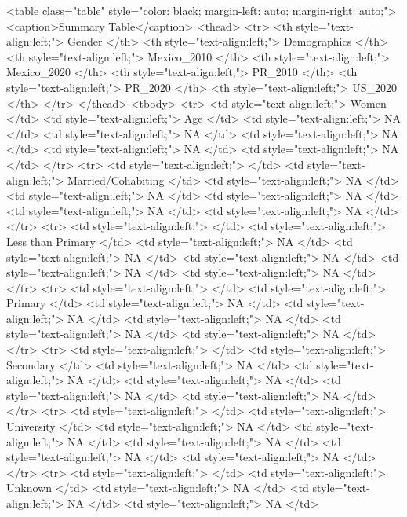 <table class="table" style="color: black; margin-left: auto; margin-right: auto;">
<caption>Summary Table</caption>
 <thead>
  <tr>
   <th style="text-align:left;"> Gender </th>
   <th style="text-align:left;"> Demographics </th>
   <th style="text-align:left;"> Mexico_2010 </th>
   <th style="text-align:left;"> Mexico_2020 </th>
   <th style="text-align:left;"> PR_2010 </th>
   <th style="text-align:left;"> PR_2020 </th>
   <th style="text-align:left;"> US_2020 </th>
  </tr>
 </thead>
<tbody>
  <tr>
   <td style="text-align:left;"> Women </td>
   <td style="text-align:left;"> Age </td>
   <td style="text-align:left;"> NA </td>
   <td style="text-align:left;"> NA </td>
   <td style="text-align:left;"> NA </td>
   <td style="text-align:left;"> NA </td>
   <td style="text-align:left;"> NA </td>
  </tr>
  <tr>
   <td style="text-align:left;">  </td>
   <td style="text-align:left;"> Married/Cohabiting </td>
   <td style="text-align:left;"> NA </td>
   <td style="text-align:left;"> NA </td>
   <td style="text-align:left;"> NA </td>
   <td style="text-align:left;"> NA </td>
   <td style="text-align:left;"> NA </td>
  </tr>
  <tr>
   <td style="text-align:left;">  </td>
   <td style="text-align:left;"> Less than Primary </td>
   <td style="text-align:left;"> NA </td>
   <td style="text-align:left;"> NA </td>
   <td style="text-align:left;"> NA </td>
   <td style="text-align:left;"> NA </td>
   <td style="text-align:left;"> NA </td>
  </tr>
  <tr>
   <td style="text-align:left;">  </td>
   <td style="text-align:left;"> Primary </td>
   <td style="text-align:left;"> NA </td>
   <td style="text-align:left;"> NA </td>
   <td style="text-align:left;"> NA </td>
   <td style="text-align:left;"> NA </td>
   <td style="text-align:left;"> NA </td>
  </tr>
  <tr>
   <td style="text-align:left;">  </td>
   <td style="text-align:left;"> Secondary </td>
   <td style="text-align:left;"> NA </td>
   <td style="text-align:left;"> NA </td>
   <td style="text-align:left;"> NA </td>
   <td style="text-align:left;"> NA </td>
   <td style="text-align:left;"> NA </td>
  </tr>
  <tr>
   <td style="text-align:left;">  </td>
   <td style="text-align:left;"> University </td>
   <td style="text-align:left;"> NA </td>
   <td style="text-align:left;"> NA </td>
   <td style="text-align:left;"> NA </td>
   <td style="text-align:left;"> NA </td>
   <td style="text-align:left;"> NA </td>
  </tr>
  <tr>
   <td style="text-align:left;">  </td>
   <td style="text-align:left;"> Unknown </td>
   <td style="text-align:left;"> NA </td>
   <td style="text-align:left;"> NA </td>
   <td style="text-align:left;"> NA </td>
